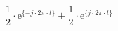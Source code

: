 \[
 \frac{1}{2}\cdot\textrm{e}^{\{-j \cdot 2\pi \cdot t \}}
+\frac{1}{2}\cdot\textrm{e}^{\{ j \cdot 2\pi \cdot t \}}
\]
